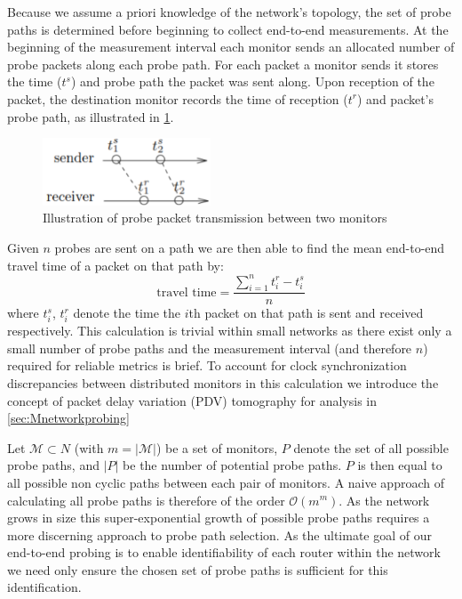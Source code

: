     Because we assume a priori knowledge of the network's topology, the set of probe paths is determined before beginning to collect end-to-end measurements. At the beginning of the measurement interval each monitor sends an allocated number of probe packets along each probe path. For each packet a monitor sends it stores the time ($t^s$) and probe path the packet was sent along. Upon reception of the packet, the destination monitor records the time of reception ($t^r$) and packet's probe path, as illustrated in \ref{fig:pptransmission}. 
    \begin{figure}[H]
        \centering
        \includegraphics[width=5cm]{figs/background/probe_transmission.png}
        \caption[Illustration of probe packet transmission between two monitors]{Illustration of probe packet transmission between two monitors \protect\cite{he_fisher_2015}}
        \label{fig:pptransmission}
    \end{figure}
    \noindent Given $n$ probes are sent on a path we are then able to find the mean end-to-end travel time of a packet on that path by: \[\text{travel time}=\frac{\sum_{i=1}^nt_i^r - t_i^s}{n}\] where $t_i^s$, $t_i^r$ denote the time the $i$th packet on that path is sent and received respectively. This calculation is trivial within small networks as there exist only a small number of probe paths and the measurement interval (and therefore $n$) required for reliable metrics is brief. To account for clock synchronization discrepancies between distributed monitors in this calculation we introduce the concept of packet delay variation (PDV) tomography for analysis in \cref{sec:Mnetworkprobing} \par

    Let $\mathcal{M}\subset N$ (with $m=|\mathcal{M}|$) be a set of monitors, $P$ denote the set of all possible probe paths, and $|P|$ be the number of potential probe paths. $P$ is then equal to all possible non cyclic paths between each pair of monitors. A naive approach of calculating all probe paths is therefore of the order $\mathcal{O}(m^m)$. As the network grows in size this super-exponential growth of possible probe paths requires a more discerning approach to probe path selection. As the ultimate goal of our end-to-end probing is to enable identifiability of each router within the network we need only ensure the chosen set of probe paths is sufficient for this identification.\par
    

